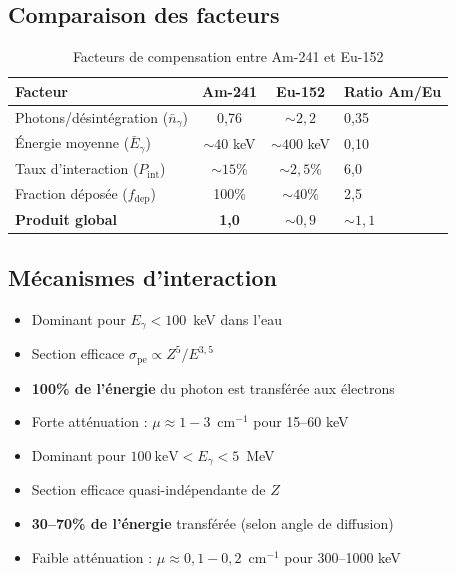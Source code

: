 \documentclass[11pt,a4paper]{article}
\begin{document}
\subsection{Comparaison des facteurs}

\begin{table}[h]
\centering
\begin{tabular}{lccC{2cm}}
\toprule
{}
\textbf{Facteur} & \textbf{Am-241} & \textbf{Eu-152} & \textbf{Ratio Am/Eu} \\
\midrule
Photons/désintégration ($\bar{n}_\gamma$) & 0,76 & $\sim 2{,}2$ & 0,35 \\
Énergie moyenne ($\bar{E}_\gamma$) & $\sim 40$ keV & $\sim 400$ keV & 0,10 \\
Taux d'interaction ($P_{\text{int}}$) & $\sim 15\%$ & $\sim 2{,}5\%$ & 6,0 \\
Fraction déposée ($f_{\text{dep}}$) & 100\% & $\sim 40\%$ & 2,5 \\
\midrule
\textbf{Produit global} & \textbf{1,0} & \textbf{$\sim 0{,}9$} & $\sim 1{,}1$ \\
\bottomrule
\end{tabular}
\caption{Facteurs de compensation entre Am-241 et Eu-152}
\end{table}

\subsection{Mécanismes d'interaction}

\begin{keypoint}
\begin{itemize}[noitemsep]
    \item Dominant pour $E_\gamma < 100$~keV dans l'eau
    \item Section efficace $\sigma_{\text{pe}} \propto Z^5 / E^{3,5}$
    \item \textbf{100\% de l'énergie} du photon est transférée aux électrons
    \item Forte atténuation : $\mu \approx 1{-}3$~cm$^{-1}$ pour 15--60 keV
\end{itemize}
\end{keypoint}

\begin{keypoint}
\begin{itemize}[noitemsep]
    \item Dominant pour $100~\text{keV} < E_\gamma < 5$~MeV
    \item Section efficace quasi-indépendante de $Z$
    \item \textbf{30--70\% de l'énergie} transférée (selon angle de diffusion)
    \item Faible atténuation : $\mu \approx 0{,}1{-}0{,}2$~cm$^{-1}$ pour 300--1000 keV
\end{itemize}
\end{keypoint}
\end{document}
